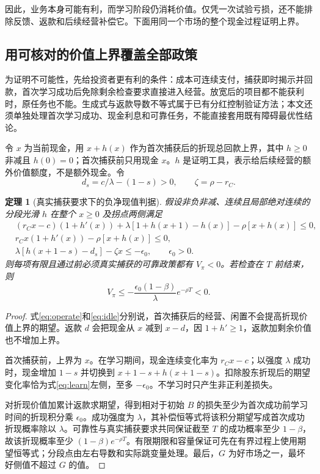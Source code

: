 \documentclass[UTF8,fontset=windows,11pt,a4paper]{ctexart}
\newtheorem{theorem}{定理}
\numberwithin{equation}{section}
\begin{document}
因此，业务本身可能有利，而学习阶段仍消耗价值。仅凭一次试验亏损，还不能排除反馈、返款和后续经营补偿它。下面用同一个市场的整个现金过程证明上界。

\subsection{用可核对的价值上界覆盖全部政策}
为证明不可能性，先给投资者更有利的条件：成本可连续支付，捕获即时揭示并回款，首次学习成功后免除剩余检查要求直接进入经营。放宽后的项目都不能获利时，原任务也不能。生成式与返款导数不等式属于已有分红控制验证方法\cite{dividend}；本文还须单独处理首次学习成功、现金利息和可靠任务，不能直接套用既有障碍最优性结论。

令 $x$ 为当前现金，用 $x+h(x)$ 作为首次捕获后的折现总回款上界，其中 $h\ge0$ 非减且 $h(0)=0$；首次捕获前只用现金 $x$。$h$ 是证明工具，表示给后续经营的额外价值额度，不是额外现金。令
\begin{equation}
 d_s=c/\lambda-(1-s)>0,\qquad\zeta=\rho-r_C.
\end{equation}

\begin{theorem}[真实捕获要求下的负净现值判据]\label{thm:negative}
假设非负非减、连续且局部绝对连续的分段光滑 $h$ 在整个 $x\ge0$ 及拐点两侧满足
\begin{align}
 &(r_Cx-c)(1+h'(x))
 +\lambda[1+h(x+1)-h(x)]-\rho[x+h(x)]\le0,\label{eq:operate}\\
 &r_Cx(1+h'(x))-\rho[x+h(x)]\le0,\label{eq:idle}\\
 &\lambda[h(x+1-s)-d_s]-\zeta x\le-\epsilon_0,
 \qquad\epsilon_0>0.\label{eq:learn}
\end{align}
则每项有限且通过前必须真实捕获的可靠政策都有 $V_\pi<0$。若检查在 $T$ 前结束，则
\begin{equation}
 V_\pi\le-\frac{\epsilon_0(1-\beta)}\lambda e^{-\rho T}<0.
\end{equation}
\end{theorem}

\begin{proof}
式\eqref{eq:operate}和\eqref{eq:idle}分别说，首次捕获后的经营、闲置不会提高折现价值上界的期望。返款 $d$ 会把现金从 $x$ 减到 $x-d$，因 $1+h'\ge1$，返款加剩余价值也不增加上界。

首次捕获前，上界为 $x$。在学习期间，现金连续变化率为 $r_Cx-c$；以强度 $\lambda$ 成功时，现金增加 $1-s$ 并切换到 $x+1-s+h(x+1-s)$。扣除股东折现后的期望变化率恰为式\eqref{eq:learn}左侧，至多 $-\epsilon_0$。不学习时只产生非正利差损失。

对折现价值加累计返款求期望，得到相对于初始 $B$ 的损失至少为首次成功前学习时间的折现积分乘 $\epsilon_0$。成功强度为 $\lambda$，其补偿恒等式将该积分期望写成首次成功折现概率除以 $\lambda$。可靠性与真实捕获要求共同保证截至 $T$ 的成功概率至少 $1-\beta$，故该折现概率至少 $(1-\beta)e^{-\rho T}$。有限期限和容量保证可先在有界过程上使用期望恒等式；分段点由左右导数和实际跳变量处理。最后，$G$ 为好市场之一，最坏好侧值不超过 $G$ 的值。
\end{proof}
\end{document}
